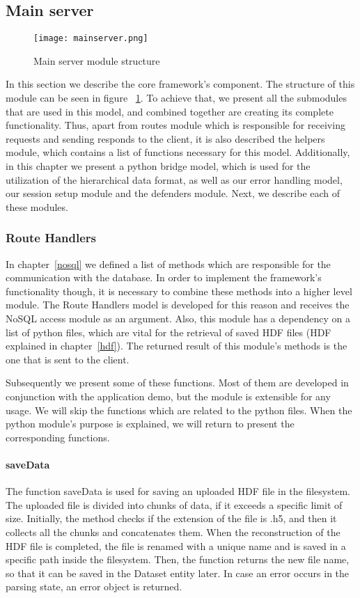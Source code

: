 \subsection{Main server}
\begin{figure}
	\centerline{\texttt{[image: mainserver.png]}}
	\caption{Main server module structure}
	\label{mainserver}
\end{figure}
In this section we describe the core framework's component.  The structure of this module can be seen in figure ~\ref{mainserver}. To achieve that, we present all the submodules that are used in this model, and combined together are creating its complete functionality. Thus, apart from routes module which is responsible for receiving requests and sending responds to the client, it is also described the helpers module, which contains a list of functions necessary for this model. Additionally, in this chapter we present a python bridge model, which is used for the utilization of the hierarchical data format, as well as our error handling model, our session setup module and the defenders module. Next, we describe each of these modules.

\subsubsection{Route Handlers}
\label{helpers}
In chapter~\ref{nosql} we defined a list of methods which are responsible for the communication with the database. In order to implement the framework's functionality though, it is necessary to combine these methods into a higher level module. The Route Handlers model is developed for this reason and receives the NoSQL access module as an argument. Also, this module has a dependency on a list of python files, which are vital for the retrieval of saved HDF files (HDF explained in chapter~\ref{hdf}). The returned result of this module's methods is the one that is sent to the client. \par
	Subsequently we present some of these functions. Most of them are developed in conjunction with the application demo, but the module is extensible for any usage. We will skip the functions which are related to the python files. When the python module's purpose is explained, we will return to present the corresponding functions.

\paragraph{saveData}
The function saveData is used for saving an uploaded HDF file in the filesystem. The uploaded file is divided into chunks of data, if it exceeds a specific limit of size. Initially, the method checks if the extension of the file is .h5, and then it collects all the chunks and concatenates them. When the reconstruction of the HDF file is completed, the file is renamed with a unique name and is saved in a specific path inside the filesystem. Then, the function returns the new file name, so that it can be saved in the Dataset entity later. In case an error occurs in the parsing state, an error object is returned.


